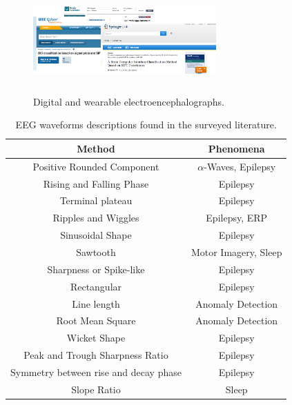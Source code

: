 \documentclass[aspectratio=169]{beamer}
\begin{document}
\begin{frame}   
\begin{figure}[]
\centering
\includegraphics[height=4cm,width=7cm]{images/Papers.png}
\caption[Wearable portable Digital Electroencephalograph]{Digital and wearable electroencephalographs.}
\label{fig:digitalelectroencephalograph}
\end{figure}
\end{frame}  

\begin{frame}  
\begin{table}[h!]
\caption{EEG waveforms descriptions found in the surveyed literature.}
\centering
\begin{tabular}{cc}
\toprule
\textbf{Method}	& \textbf{Phenomena} 	\\
\midrule
Positive Rounded Component                    & $\alpha$-Waves, Epilepsy  \\
Rising and Falling Phase      & Epilepsy  \\
Terminal plateau      & Epilepsy  \\
Ripples and Wiggles     & Epilepsy, ERP  \\
Sinusoidal Shape        & Epilepsy  \\
Sawtooth                     & Motor Imagery, Sleep  \\
Sharpness or Spike-like     & Epilepsy  \\
Rectangular     & Epilepsy  \\
Line length       & Anomaly Detection\\
Root Mean Square & Anomaly Detection \\
Wicket Shape     & Epilepsy \\
Peak and Trough Sharpness Ratio     & Epilepsy \\
Symmetry between rise and decay phase     & Epilepsy  \\
Slope Ratio    & Sleep  \\
\bottomrule
\end{tabular}
\label{tab:methods}
\end{table}
\end{frame}  
\end{document}
